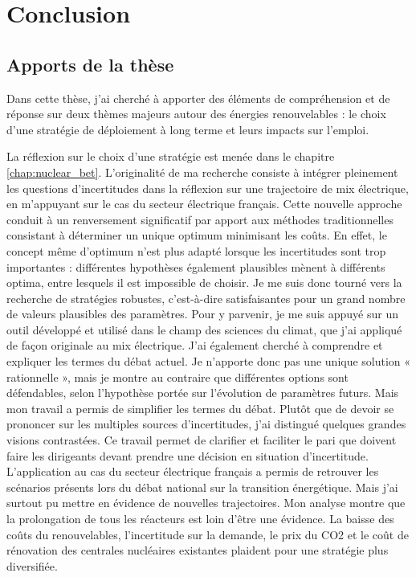 \chapter{Conclusion} \label{chap:conclusion}

\section{Apports de la thèse}

Dans cette thèse, j’ai cherché à apporter des éléments de compréhension et de réponse sur deux thèmes majeurs autour des énergies renouvelables : le choix d’une stratégie de déploiement à long terme et leurs impacts sur l’emploi. 

La réflexion sur le choix d’une stratégie est menée dans le chapitre \ref{chap:nuclear_bet}. L’originalité de ma recherche consiste à intégrer pleinement les questions d’incertitudes dans la réflexion sur une trajectoire de mix électrique, en m’appuyant sur le cas du secteur électrique français.
Cette nouvelle approche conduit à un renversement significatif par apport aux méthodes traditionnelles consistant à déterminer un unique optimum minimisant les coûts. 
En effet, le concept même d’optimum n’est plus adapté lorsque les incertitudes sont trop importantes : différentes hypothèses également plausibles mènent à différents optima, entre lesquels il est impossible de choisir. Je me suis donc tourné vers la recherche de stratégies robustes, c’est-à-dire satisfaisantes pour un grand nombre de valeurs plausibles des paramètres. Pour y parvenir, je me suis appuyé sur un outil développé et utilisé dans le champ des sciences du climat, que j’ai appliqué de façon originale au mix électrique.
J’ai également cherché à comprendre et expliquer les termes du débat actuel. Je n’apporte donc pas une unique solution « rationnelle », mais je montre au contraire que différentes options sont défendables, selon l’hypothèse portée sur l’évolution de paramètres futurs. Mais mon travail a permis de simplifier les termes du débat. Plutôt que de devoir se prononcer sur les multiples sources d’incertitudes, j’ai distingué quelques grandes visions contrastées. Ce travail permet de clarifier et faciliter le pari que doivent faire les dirigeants devant prendre une décision en situation d’incertitude. 
L’application au cas du secteur électrique français a permis de retrouver les scénarios présents lors du débat national sur la transition énergétique. Mais j’ai surtout pu mettre en évidence de nouvelles trajectoires. Mon analyse montre que la prolongation de tous les réacteurs est loin d’être une évidence. La baisse des coûts du renouvelables, l’incertitude sur la demande, le prix du CO2 et le coût de rénovation des centrales nucléaires existantes plaident pour une stratégie plus diversifiée.
